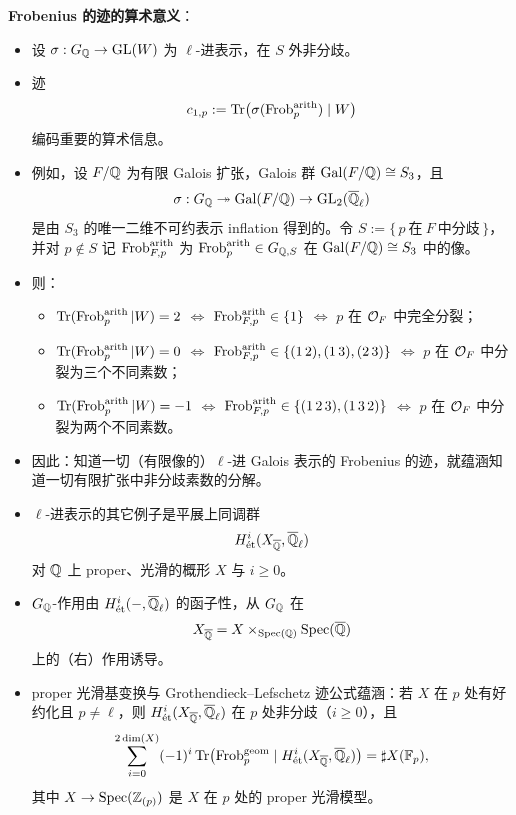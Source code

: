 \textbf{Frobenius 的迹的算术意义}：
\begin{itemize}
\item 设 $\sigma:G_{\mathbb{Q}}\to\operatorname{GL}(W)$ 为 $\ell$-进表示，在 $S$ 外非分歧。
\item 迹
\[
c_{1,p}:=\operatorname{Tr}\bigl(\sigma(\operatorname{Frob}_p^{\mathrm{arith}})\mid W\bigr)
\]
编码重要的算术信息。
\item 例如，设 $F/\mathbb{Q}$ 为有限 Galois 扩张，Galois 群 $\operatorname{Gal}(F/\mathbb{Q})\cong S_3$，且
\[
\sigma:G_{\mathbb{Q}}\twoheadrightarrow\operatorname{Gal}(F/\mathbb{Q})\to\operatorname{GL}_2(\overline{\mathbb{Q}}_\ell)
\]
是由 $S_3$ 的唯一二维不可约表示 inflation 得到的。令 $S:=\{\,p\ \text{在}\ F\ \text{中分歧}\,\}$，并对 $p\notin S$ 记 $\operatorname{Frob}_{F,p}^{\mathrm{arith}}$ 为 $\operatorname{Frob}_p^{\mathrm{arith}}\in G_{\mathbb{Q},S}$ 在 $\operatorname{Gal}(F/\mathbb{Q})\cong S_3$ 中的像。
\item 则：
\begin{itemize}
\item $\operatorname{Tr}(\operatorname{Frob}_p^{\mathrm{arith}}|W)=2$ $\Leftrightarrow$ $\operatorname{Frob}_{F,p}^{\mathrm{arith}}\in\{1\}$ $\Leftrightarrow$ $p$ 在 $\mathcal{O}_F$ 中完全分裂；
\item $\operatorname{Tr}(\operatorname{Frob}_p^{\mathrm{arith}}|W)=0$ $\Leftrightarrow$ $\operatorname{Frob}_{F,p}^{\mathrm{arith}}\in\{(1\,2),(1\,3),(2\,3)\}$ $\Leftrightarrow$ $p$ 在 $\mathcal{O}_F$ 中分裂为三个不同素数；
\item $\operatorname{Tr}(\operatorname{Frob}_p^{\mathrm{arith}}|W)=-1$ $\Leftrightarrow$ $\operatorname{Frob}_{F,p}^{\mathrm{arith}}\in\{(1\,2\,3),(1\,3\,2)\}$ $\Leftrightarrow$ $p$ 在 $\mathcal{O}_F$ 中分裂为两个不同素数。
\end{itemize}
\item 因此：知道一切（有限像的）$\ell$-进 Galois 表示的 Frobenius 的迹，就蕴涵知道一切有限扩张中非分歧素数的分解。
\item $\ell$-进表示的其它例子是平展上同调群
\[
H^i_{\text{ét}}(X_{\overline{\mathbb{Q}}},\overline{\mathbb{Q}}_\ell)
\]
对 $\mathbb{Q}$ 上 proper、光滑的概形 $X$ 与 $i\ge0$。
\item $G_{\mathbb{Q}}$-作用由 $H^i_{\text{ét}}(-,\overline{\mathbb{Q}}_\ell)$ 的函子性，从 $G_{\mathbb{Q}}$ 在
\[
X_{\overline{\mathbb{Q}}}=X\times_{\operatorname{Spec}(\mathbb{Q})}\operatorname{Spec}(\overline{\mathbb{Q}})
\]
上的（右）作用诱导。
\item proper 光滑基变换与 Grothendieck--Lefschetz 迹公式蕴涵：若 $X$ 在 $p$ 处有好约化且 $p\neq\ell$，则 $H^i_{\text{ét}}(X_{\overline{\mathbb{Q}}},\overline{\mathbb{Q}}_\ell)$ 在 $p$ 处非分歧（$i\ge0$），且
\[
\sum_{i=0}^{2\dim(X)}(-1)^i\operatorname{Tr}\bigl(\operatorname{Frob}_p^{\mathrm{geom}}\mid H^i_{\text{ét}}(X_{\overline{\mathbb{Q}}},\overline{\mathbb{Q}}_\ell)\bigr)=\sharp X(\mathbb{F}_p),
\]
其中 $X\to\operatorname{Spec}(\mathbb{Z}_{(p)})$ 是 $X$ 在 $p$ 处的 proper 光滑模型。
\end{itemize}

